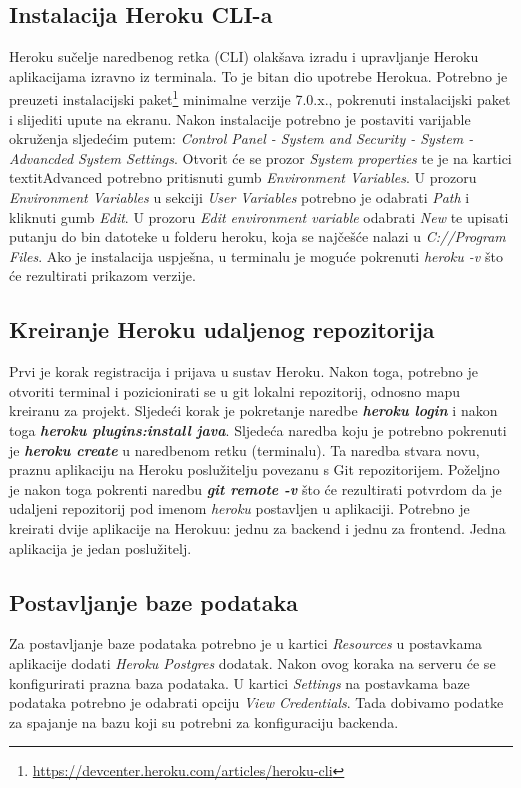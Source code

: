 				
			\subsection{Instalacija Heroku CLI-a}
				Heroku sučelje naredbenog retka (CLI) olakšava izradu i upravljanje Heroku aplikacijama izravno iz terminala. To je bitan dio upotrebe Herokua. Potrebno je preuzeti instalacijski paket\footnote{\url{https://devcenter.heroku.com/articles/heroku-cli}} minimalne verzije 7.0.x., pokrenuti instalacijski paket i slijediti upute na ekranu. Nakon instalacije potrebno je postaviti varijable okruženja sljedećim putem: \textit{Control Panel - System and Security - System - Advancded System Settings}. Otvorit će se prozor \textit{System properties} te je na kartici textit{Advanced} potrebno pritisnuti gumb \textit{Environment Variables}. U prozoru \textit{Environment Variables} u sekciji \textit{User Variables} potrebno je odabrati \textit{Path} i kliknuti gumb \textit{Edit}. U prozoru \textit{Edit environment variable} odabrati \textit{New} te upisati putanju do bin datoteke u folderu heroku, koja se najčešće nalazi u \textit{C://Program Files}. Ako je instalacija uspješna, u terminalu je moguće
				pokrenuti \textit{heroku -v} što će rezultirati prikazom verzije.\\
				
				
			\subsection{Kreiranje Heroku udaljenog repozitorija}
				Prvi je korak registracija i prijava u sustav Heroku. Nakon toga, potrebno je otvoriti terminal i pozicionirati se u git lokalni repozitorij, odnosno mapu kreiranu za projekt. Sljedeći korak je pokretanje naredbe \textbf{\textit{heroku login}} i nakon toga \textbf{\textit{heroku plugins:install java}}. Sljedeća naredba koju je potrebno pokrenuti je \textbf{\textit{heroku create}} u naredbenom retku (terminalu). Ta naredba stvara novu, praznu aplikaciju na Heroku poslužitelju povezanu s Git repozitorijem. Poželjno je nakon toga pokrenti naredbu \textbf{\textit{git remote -v}} što će rezultirati potvrdom da je udaljeni repozitorij pod imenom \textit{heroku} postavljen u aplikaciji.\newline
				\indent Potrebno je kreirati dvije aplikacije na Herokuu: jednu za backend i jednu za frontend. Jedna aplikacija je jedan poslužitelj.\\
				
				
			\subsection{Postavljanje baze podataka}
				Za postavljanje baze podataka potrebno je u kartici \textit{Resources} u postavkama aplikacije dodati \textit{Heroku Postgres} dodatak. Nakon ovog koraka na serveru će se konfigurirati prazna baza podataka. U kartici \textit{Settings} na postavkama baze podataka potrebno je odabrati opciju \textit{View Credentials}. Tada dobivamo podatke za spajanje na bazu koji su potrebni za konfiguraciju backenda.\\
				
